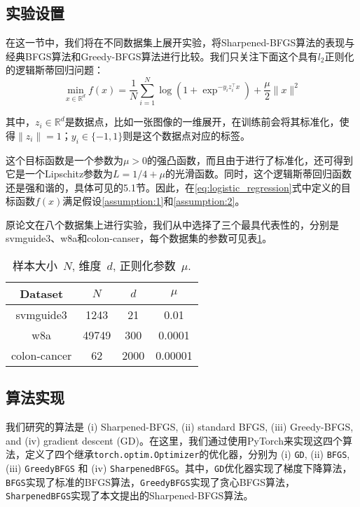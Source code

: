 \documentclass[a4paper,twoside,AutoFakeBold]{article}
\theoremstyle{definition}
\begin{document}
\subsection{实验设置}
在这一节中，我们将在不同数据集上展开实验，将Sharpened-BFGS算法的表现与经典BFGS算法和Greedy-BFGS算法进行比较。我们只关注下面这个具有$l_2$正则化的逻辑斯蒂回归问题：
\begin{equation}\label{eq:logistic_regression}
    \min_{x\in\mathbb{R}^d}f(x) = \frac{1}{N} \sum_{i=1}^N \log(1 + \exp^{-y_iz_i^{\top}x}) + \frac{\mu}{2} \|x\|^2
\end{equation}

其中，$z_i\in\mathbb{R}^d$是数据点，比如一张图像的一维展开，在训练前会将其标准化，使得$\|z_i\| = 1$；$y_i\in\{-1, 1\}$则是这个数据点对应的标签。

这个目标函数是一个参数为$\mu > 0$的强凸函数，而且由于进行了标准化，还可得到它是一个Lipschitz参数为$L = 1/4 + \mu$的光滑函数。同时，这个逻辑斯蒂回归函数还是强和谐的，具体可见\cite{rodomanov2020greedy}的5.1节。因此，在\ref{eq:logistic_regression}式中定义的目标函数$f(x)$满足假设\ref{assumption:1}和\ref{assumption:2}。

原论文在八个数据集上进行实验，我们从中选择了三个最具代表性的，分别是svmguide3、w8a和colon-canser，每个数据集的参数可见表\ref{tab:datasets}。

\begin{table}
    \centering
    \begin{tabular}{ |c|c|c|c| }
      \hline
      Dataset & $N$ & $d$ & $\mu$ \\
      \hline
      \hline
      svmguide3 & 1243 & 21 & 0.01 \\
      \hline
      w8a & 49749& 300 & 0.0001 \\
      \hline
      colon-cancer & 62 & 2000 & 0.00001 \\
      \hline
    \end{tabular}
    \caption{样本大小~$N$, 维度~$d$, 正则化参数~$\mu$.}
    \label{tab:datasets}
\end{table}

\subsection{算法实现}
我们研究的算法是 (i) Sharpened-BFGS, (ii) standard BFGS, (iii) Greedy-BFGS, and (iv) gradient descent (GD)。在这里，我们通过使用PyTorch来实现这四个算法，定义了四个继承\texttt{torch.optim.Optimizer}的优化器，分别为 (i) \texttt{GD}, (ii) \texttt{BFGS}, (iii) \texttt{GreedyBFGS} 和 (iv) \texttt{SharpenedBFGS}。其中，\texttt{GD}优化器实现了梯度下降算法，\texttt{BFGS}实现了标准的BFGS算法，\texttt{GreedyBFGS}实现了贪心BFGS算法，\texttt{SharpenedBFGS}实现了本文提出的Sharpened-BFGS算法。
\end{document}
